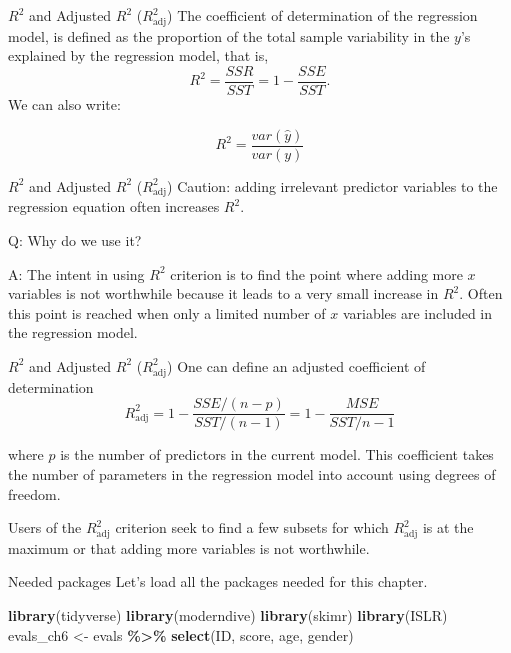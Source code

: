 \documentclass[
  ignorenonframetext,
]{beamer}
\newenvironment{Shaded}{\begin{snugshade}}{\end{snugshade}}
\newcommand{\FunctionTok}[1]{\textcolor[rgb]{0.13,0.29,0.53}{\textbf{#1}}}
\newcommand{\NormalTok}[1]{#1}
\newcommand{\OtherTok}[1]{\textcolor[rgb]{0.56,0.35,0.01}{#1}}
\newcommand{\SpecialCharTok}[1]{\textcolor[rgb]{0.81,0.36,0.00}{\textbf{#1}}}
\begin{document}
\begin{frame}{\(R^2\) and Adjusted \(R^2\) (\(R^2_{\text{adj}}\))}
\protect\hypertarget{r2-and-adjusted-r2-r2_textadj}{}
The coefficient of determination of the regression model, is defined as
the proportion of the total sample variability in the \(y\)'s explained
by the regression model, that is,
\[R^2=\frac{SSR}{SST}=1-\frac{SSE}{SST}.\] We can also write:

\[R^2=\frac{var(\hat{y})}{var(y)}\]
\end{frame}

\begin{frame}{\(R^2\) and Adjusted \(R^2\) (\(R^2_{\text{adj}}\))}
\protect\hypertarget{r2-and-adjusted-r2-r2_textadj-1}{}
Caution: adding irrelevant predictor variables to the regression
equation often increases \(R^2\).

Q: Why do we use it?

A: The intent in using \(R^2\) criterion is to find the point where
adding more \(x\) variables is not worthwhile because it leads to a very
small increase in \(R^2\). Often this point is reached when only a
limited number of \(x\) variables are included in the regression model.
\end{frame}

\begin{frame}{\(R^2\) and Adjusted \(R^2\) (\(R^2_{\text{adj}}\))}
\protect\hypertarget{r2-and-adjusted-r2-r2_textadj-2}{}
One can define an adjusted coefficient of determination
\[R^2_{\text{adj}}=1-\frac{SSE/(n-p)}{SST/ (n-1)}=1-\frac{MSE}{SST/n-1}\]

where \(p\) is the number of predictors in the current model. This
coefficient takes the number of parameters in the regression model into
account using degrees of freedom.

Users of the \(R^2_{\text{adj}}\) criterion seek to find a few subsets
for which \(R^2_{\text{adj}}\) is at the maximum or that adding more
variables is not worthwhile.
\end{frame}

\begin{frame}[fragile]{Needed packages}
\protect\hypertarget{needed-packages}{}
Let's load all the packages needed for this chapter.

\normalsize

\begin{Shaded}
\begin{Highlighting}[]
\FunctionTok{library}\NormalTok{(tidyverse) }
\FunctionTok{library}\NormalTok{(moderndive)}
\FunctionTok{library}\NormalTok{(skimr)}
\FunctionTok{library}\NormalTok{(ISLR)}
\NormalTok{evals\_ch6 }\OtherTok{\textless{}{-}}\NormalTok{ evals }\SpecialCharTok{\%\textgreater{}\%}
  \FunctionTok{select}\NormalTok{(ID, score, age, gender)}
\end{Highlighting}
\end{Shaded}

\normalsize
\end{frame}
\end{document}
